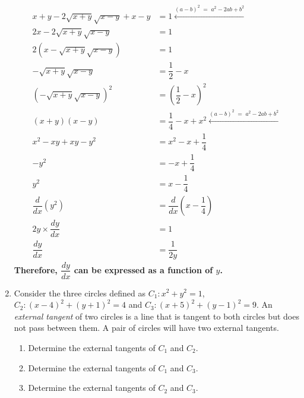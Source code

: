 \documentclass[12pt]{book}
\begin{document}
\begin{enumerate}
\begin{align}
    x+y - 2\sqrt{x+y}\sqrt{x-y} +x-y &= 1 \xleftarrow[]{(a-b)^2\; =\; a^2-2ab+b^2}\\
    2x - 2 \sqrt{x+y}\sqrt{x-y} &= 1\\
    2(x -  \sqrt{x+y}\sqrt{x-y}) &= 1\\
    - \sqrt{x+y}\sqrt{x-y} &= \dfrac{1}{2} - x\\
    \left(- \sqrt{x+y}\sqrt{x-y}\right)^2 &= \left(\dfrac{1}{2} - x\right)^2\\
    (x+y)(x-y)  &= \dfrac{1}{4} - x + x^2 \xleftarrow[]{(a-b)^2\; =\; a^2-2ab+b^2}\\
    x^2 - xy + xy - y^2  &= x^2 -x + \dfrac{1}{4}\\
    -y^2 &= -x + \dfrac{1}{4} \\
    y^2 &= x - \dfrac{1}{4} \\
    \dfrac{d}{dx} \left(y^2\right) &= \dfrac{d}{dx} \left(x - \dfrac{1}{4}\right) \\
    2y \times \dfrac{dy}{dx} &= 1 \\
    \dfrac{dy}{dx} &= \dfrac{1}{2y}
\end{align}
\endgroup
\textbf{Therefore, $\dfrac{dy}{dx}$ can be expressed as a function of $y$.}



\newpage

\setcounter{equation}{0}
\item Consider the three circles defined as $C_1 : x^2 + y^2 = 1$, $C_2 : (x-4)^2 + (y+1)^2 = 4$ and $C_3 : (x+5)^2 + (y-1)^2 = 9$. An \emph{external tangent} of two circles is a line that is tangent to both circles but does not pass between them. A pair of circles will have two external tangents.  

\begin{enumerate}
\item Determine the external tangents of $C_1$ and $C_2$.

\item Determine the external tangents of $C_1$ and $C_3$.

\item Determine the external tangents of $C_2$ and $C_3$.


\end{enumerate}
\end{enumerate}
\end{document}
